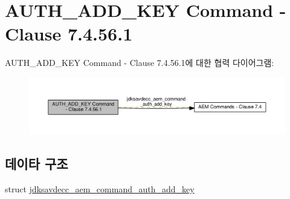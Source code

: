 \hypertarget{group__command__auth__add__key}{}\section{A\+U\+T\+H\+\_\+\+A\+D\+D\+\_\+\+K\+EY Command -\/ Clause 7.4.56.1}
\label{group__command__auth__add__key}
A\+U\+T\+H\+\_\+\+A\+D\+D\+\_\+\+K\+EY Command -\/ Clause 7.4.56.1에 대한 협력 다이어그램\+:
\nopagebreak
\begin{figure}[H]
\begin{center}
\leavevmode
\includegraphics[width=350pt]{group__command__auth__add__key}
\end{center}
\end{figure}
\subsection*{데이타 구조}
\begin{DoxyCompactItemize}
\item 
struct \hyperlink{structjdksavdecc__aem__command__auth__add__key}{jdksavdecc\+\_\+aem\+\_\+command\+\_\+auth\+\_\+add\+\_\+key}
\end{DoxyCompactItemize}
